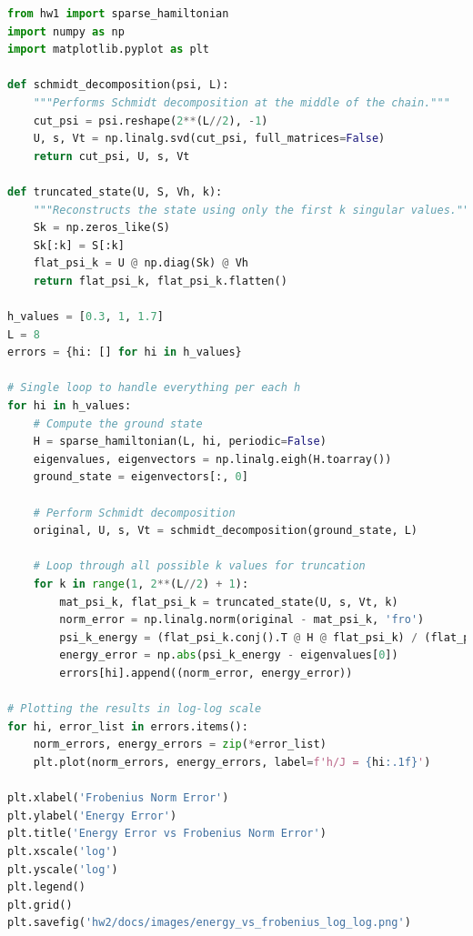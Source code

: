 \documentclass[12pt]{article}
\begin{document}
\begin{lstlisting}[language=Python]
from hw1 import sparse_hamiltonian
import numpy as np
import matplotlib.pyplot as plt

def schmidt_decomposition(psi, L):
    """Performs Schmidt decomposition at the middle of the chain."""
    cut_psi = psi.reshape(2**(L//2), -1)
    U, s, Vt = np.linalg.svd(cut_psi, full_matrices=False)
    return cut_psi, U, s, Vt

def truncated_state(U, S, Vh, k):
    """Reconstructs the state using only the first k singular values."""
    Sk = np.zeros_like(S)
    Sk[:k] = S[:k]
    flat_psi_k = U @ np.diag(Sk) @ Vh
    return flat_psi_k, flat_psi_k.flatten()

h_values = [0.3, 1, 1.7]
L = 8
errors = {hi: [] for hi in h_values}

# Single loop to handle everything per each h
for hi in h_values:
    # Compute the ground state
    H = sparse_hamiltonian(L, hi, periodic=False)
    eigenvalues, eigenvectors = np.linalg.eigh(H.toarray())
    ground_state = eigenvectors[:, 0]
    
    # Perform Schmidt decomposition
    original, U, s, Vt = schmidt_decomposition(ground_state, L)
    
    # Loop through all possible k values for truncation
    for k in range(1, 2**(L//2) + 1):
        mat_psi_k, flat_psi_k = truncated_state(U, s, Vt, k)
        norm_error = np.linalg.norm(original - mat_psi_k, 'fro')
        psi_k_energy = (flat_psi_k.conj().T @ H @ flat_psi_k) / (flat_psi_k.conj().T @ flat_psi_k)
        energy_error = np.abs(psi_k_energy - eigenvalues[0])
        errors[hi].append((norm_error, energy_error))

# Plotting the results in log-log scale
for hi, error_list in errors.items():
    norm_errors, energy_errors = zip(*error_list)
    plt.plot(norm_errors, energy_errors, label=f'h/J = {hi:.1f}')

plt.xlabel('Frobenius Norm Error')
plt.ylabel('Energy Error')
plt.title('Energy Error vs Frobenius Norm Error')
plt.xscale('log')
plt.yscale('log')
plt.legend()
plt.grid()
plt.savefig('hw2/docs/images/energy_vs_frobenius_log_log.png')

\end{lstlisting}
\newpage
\end{document}
